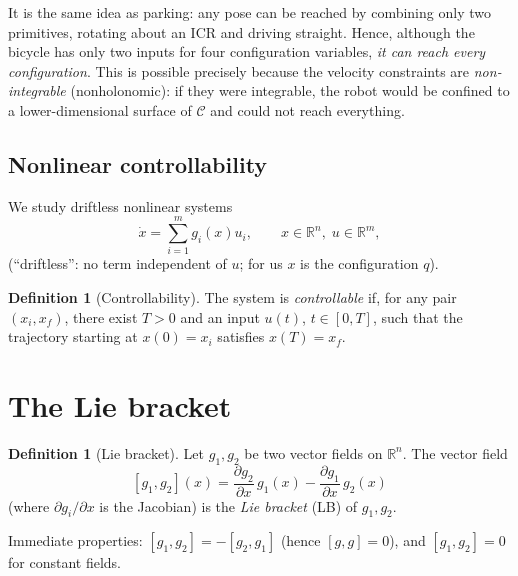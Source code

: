 \documentclass[11pt,a4paper]{article}
\newcommand{\R}{\mathbb{R}}
\newcommand{\LB}[2]{[#1,#2]}
\theoremstyle{plain}
\theoremstyle{definition}
\newtheorem{definition}[theorem]{Definition}
\theoremstyle{remark}
\begin{document}
\begin{intuition}
It is the same idea as parking: any pose can be reached by combining only two primitives, rotating about an ICR and driving straight. Hence, although the bicycle has only two inputs for four configuration variables, \emph{it can reach every configuration}. This is possible precisely because the velocity constraints are \emph{non-integrable} (nonholonomic): if they were integrable, the robot would be confined to a lower-dimensional surface of $\mathcal C$ and could not reach everything.
\end{intuition}

\subsection{Nonlinear controllability}

We study driftless nonlinear systems
\[
\dot x=\sum_{i=1}^m g_i(x)u_i,\qquad x\in\R^n,\; u\in\R^m,
\]
(``driftless'': no term independent of $u$; for us $x$ is the configuration $q$).

\begin{definition}[Controllability]
The system is \emph{controllable} if, for any pair $(x_i,x_f)$, there exist $T>0$ and an input $u(t)$, $t\in[0,T]$, such that the trajectory starting at $x(0)=x_i$ satisfies $x(T)=x_f$.
\end{definition}

\section{The Lie bracket}

\begin{definition}[Lie bracket]
Let $g_1,g_2$ be two vector fields on $\R^n$. The vector field
\[
\LB{g_1}{g_2}(x)=\frac{\partial g_2}{\partial x}\,g_1(x)-\frac{\partial g_1}{\partial x}\,g_2(x)
\]
(where $\partial g_i/\partial x$ is the Jacobian) is the \emph{Lie bracket} (LB) of $g_1,g_2$.
\end{definition}

Immediate properties: $\LB{g_1}{g_2}=-\LB{g_2}{g_1}$ (hence $\LB{g}{g}=0$), and $\LB{g_1}{g_2}=0$ for constant fields.
\end{document}

